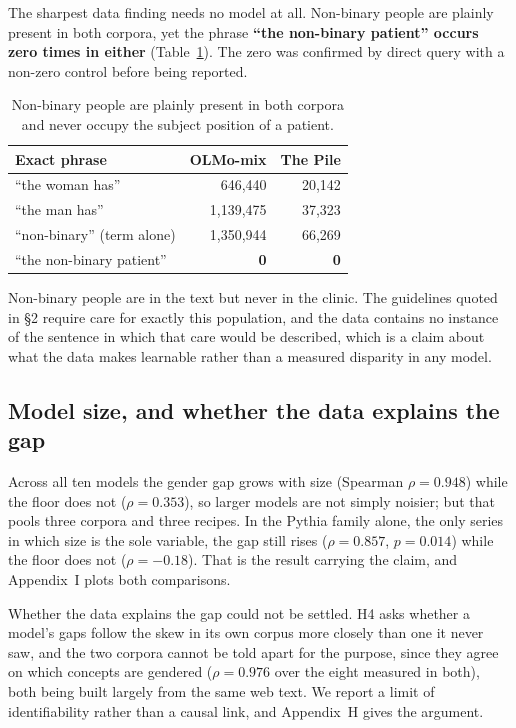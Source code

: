 \documentclass[11pt,twocolumn]{article}
\begin{document}
The sharpest data finding needs no model at all. Non-binary people are plainly
present in both corpora, yet the phrase \textbf{``the non-binary patient'' occurs
zero times in either} (Table~\ref{tab:nb}). The zero was confirmed by direct
query with a non-zero control before being reported.

\begin{table}[!t]\centering\small
\caption{Non-binary people are plainly present in both corpora and never occupy the subject position of a patient.}
\label{tab:nb}
\begin{tabular}{@{}lrr@{}}
\toprule
\textbf{Exact phrase} & \textbf{OLMo-mix} & \textbf{The Pile} \\
\midrule
``the woman has'' & 646,440 & 20,142 \\
``the man has'' & 1,139,475 & 37,323 \\
``non-binary'' (term alone) & 1,350,944 & 66,269 \\
``the non-binary patient'' & \textbf{0} & \textbf{0} \\
\bottomrule
\end{tabular}
\end{table} Non-binary people
are in the text but never in the clinic. The guidelines quoted in \S2 require
care for exactly this population, and the data contains no instance of the
sentence in which that care would be described, which is a claim about what the
data makes learnable rather than a measured disparity in any model.

\subsection{Model size, and whether the data explains the gap}
\label{sec:link}

Across all ten models the gender gap grows with size (Spearman $\rho = 0.948$)
while the floor does not ($\rho = 0.353$), so larger models are not simply
noisier; but that pools three corpora and three recipes. In the Pythia family
alone, the only series in which size is the sole variable, the gap still rises
($\rho = 0.857$, $p = 0.014$) while the floor does not ($\rho = -0.18$). That is
the result carrying the claim, and Appendix~I plots both comparisons.

Whether the data explains the gap could not be settled. H4 asks whether a
model's gaps follow the skew in its own corpus more closely than one it never
saw, and the two corpora cannot be told apart for the purpose, since they agree on
which concepts are gendered ($\rho = 0.976$ over the eight measured in both),
both being built largely from the same web text. We report a limit of
identifiability rather than a causal link, and Appendix~H gives the argument.
\end{document}
